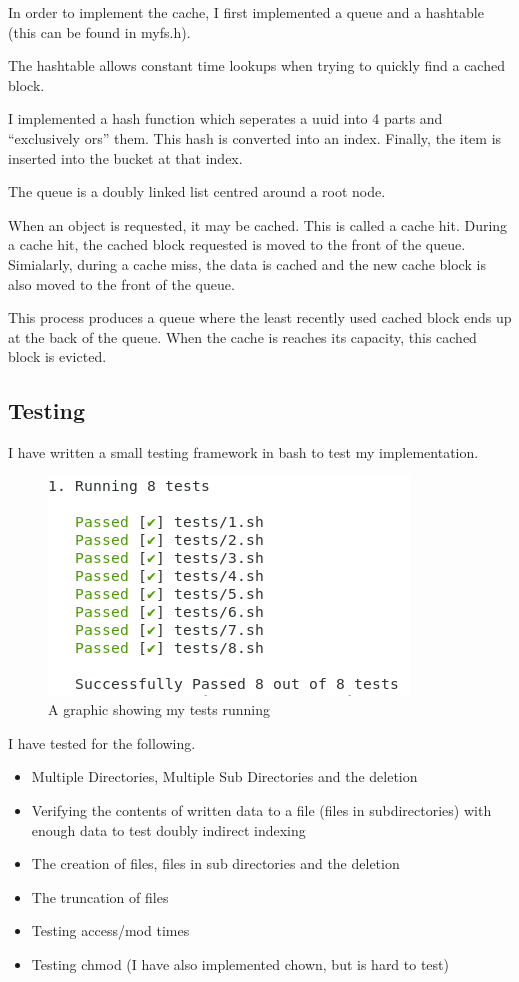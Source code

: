 \documentclass{article}
\begin{document}
In order to implement the cache, I first implemented a queue and a hashtable (this can be found in myfs.h). 

The hashtable allows constant time lookups when trying to quickly find a cached block.

I implemented a hash function which seperates a uuid into 4 parts and ``exclusively ors'' them. This hash is converted into an index. Finally, the item is inserted into the bucket at that index.

The queue is a doubly linked list centred around a root node. 

When an object is requested, it may be cached. This is called a cache hit. During a cache hit, the cached block requested is moved to the front of the queue. Simialarly, during a cache miss, the data is cached and the new cache block is also moved to the front of the queue.

This process produces a queue where the least recently used cached block ends up at the back of the queue. When the cache is reaches its capacity, this cached block is evicted.

\subsection{Testing}

I have written a small testing framework in bash to test my implementation.

\begin{figure}[!htb]
  \caption{A graphic showing my tests running}
  \center
\includegraphics[scale=0.30]{images/tests.png}
\end{figure}

I have tested for the following.

\begin{itemize}
\item Multiple Directories, Multiple Sub Directories and the deletion
\item Verifying the contents of written data to a file (files in subdirectories) with enough data to test doubly indirect indexing
\item The creation of files, files in sub directories and the deletion
\item The truncation of files
\item Testing access/mod times
\item Testing chmod (I have also implemented chown, but is hard to test)
\end{itemize}
\end{document}
